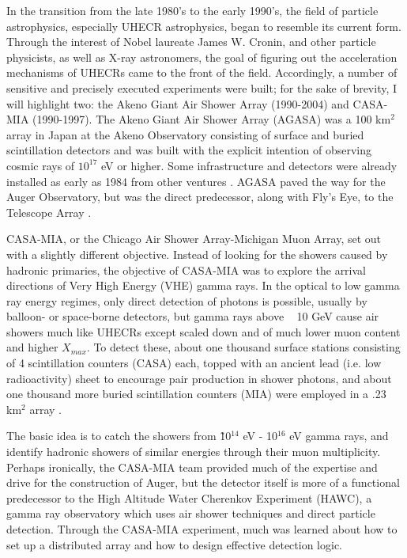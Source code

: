 In the transition from the late 1980's to the early 1990's, the field of particle astrophysics, especially UHECR astrophysics, began to resemble its current form. Through the interest of Nobel laureate James W. Cronin, and other particle physicists, as well as X-ray astronomers, the goal of figuring out the acceleration mechanisms of UHECRs came to the front of the field. Accordingly, a number of sensitive and precisely executed experiments were built; for the sake of brevity, I will highlight two: the Akeno Giant Air Shower Array (1990-2004) and CASA-MIA (1990-1997). The Akeno Giant Air Shower Array (AGASA) was a 100 km$^2$ array in Japan at the Akeno Observatory consisting of surface and buried scintillation detectors and was built with the explicit intention of observing cosmic rays of $10^{17}$ eV or higher. Some infrastructure and detectors were already installed as early as 1984 from other ventures \cite{agasa}. AGASA paved the way for the Auger Observatory, but was the direct predecessor, along with Fly's Eye, to the Telescope Array \cite{ultraray}. 

CASA-MIA, or the Chicago Air Shower Array-Michigan Muon Array, set out with a slightly different objective. Instead of looking for the showers caused by hadronic primaries, the objective of CASA-MIA was to explore the arrival directions of Very High Energy (VHE) gamma rays. In the optical to low gamma ray energy regimes, only direct detection of photons is possible, usually by balloon- or space-borne detectors, but gamma rays above ~ 10 GeV cause air showers much like UHECRs except scaled down and of much lower muon content and higher $X_{max}$. To detect these, about one thousand surface stations consisting of 4 scintillation counters (CASA) each, topped with an ancient lead (i.e. low radioactivity) sheet to encourage pair production in shower photons, and about one thousand more buried scintillation counters (MIA) were employed in a .23 km$^2$ array \cite{casamia}. 

 The basic idea is to catch the showers from \~ 10$^{14}$ eV - 10$^{16}$ eV gamma rays, and identify hadronic showers of similar energies through their muon multiplicity. Perhaps ironically, the CASA-MIA team provided much of the expertise and drive for the construction of Auger, but the detector itself is more of a functional predecessor to the High Altitude Water Cherenkov Experiment (HAWC), a gamma ray observatory which uses air shower techniques and direct particle detection. Through the CASA-MIA experiment, much was learned about how to set up a distributed array and how to design effective detection logic. 
 
